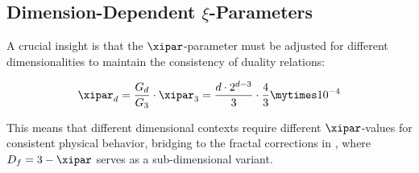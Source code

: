 	\begin{table}[htbp]
		\centering
		\caption{Geometric factors for various dimensionalities, extended with application examples}
		\label{tab:geometric_factors}
	\end{table}
	
	\subsection{Dimension-Dependent $\xi$-Parameters}
	\label{subsec:dimension_dependent_xi}
	
	A crucial insight is that the $\xipar$-parameter must be adjusted for different dimensionalities to maintain the consistency of duality relations:
	
	\begin{equation}
		\xipar_d = \frac{G_d}{G_3} \cdot \xipar_3 = \frac{d \cdot 2^{d-3}}{3} \cdot \frac{4}{3} \mytimes 10^{-4}
	\end{equation}
	
	This means that different dimensional contexts require different $\xipar$-values for consistent physical behavior, bridging to the fractal corrections in \cite{T0_g2_erweiterung}, where $D_f = 3 - \xipar$ serves as a sub-dimensional variant.
	
